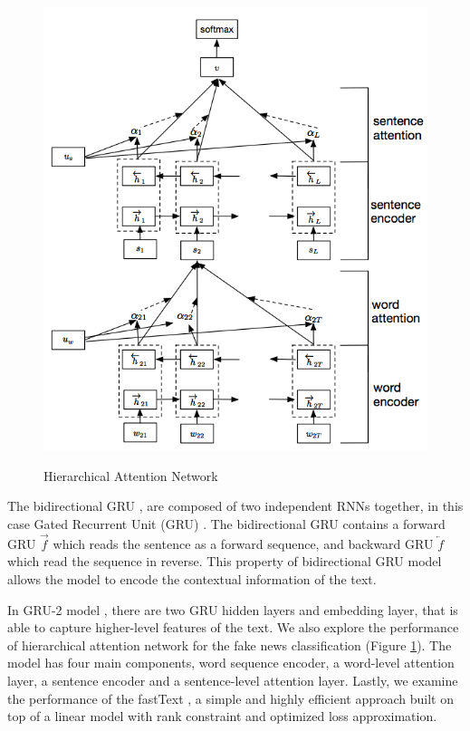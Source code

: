 \begin{figure}[!ht]
\centering
\caption{\small{Hierarchical Attention Network \cite{Yang2016HierarchicalAN}}}
\includegraphics[scale=.5]{img/HierachicalAttention}
\label{fig:HAN}
\end{figure}

The bidirectional GRU \cite{DBLP:journals/corr/BahdanauCB14},  are composed of two independent RNNs together, in this case Gated Recurrent Unit (GRU) \cite{ChoMGBSB14}. The bidirectional GRU contains a forward GRU $\overrightarrow{f} $ which reads the sentence as a forward sequence, and backward GRU $\overleftarrow{f}$ which read the sequence in reverse. This property of bidirectional GRU model allows the model to encode the contextual information of the text.

In GRU-2 model \cite{Ma2016DetectingRF}, there are two GRU hidden layers and embedding layer, that is able to capture higher-level features of the text.  We also explore the performance of hierarchical attention network \cite{Yang2016HierarchicalAN} for the fake news classification (Figure \ref{fig:HAN}). The model has four main components, word sequence encoder, a word-level attention layer, a sentence encoder and a sentence-level attention layer. Lastly, we examine the performance of the fastText \cite{DBLP:journals/corr/JoulinGBM16}, a simple and highly efficient approach built on top of a linear model with rank constraint and optimized loss approximation.  



